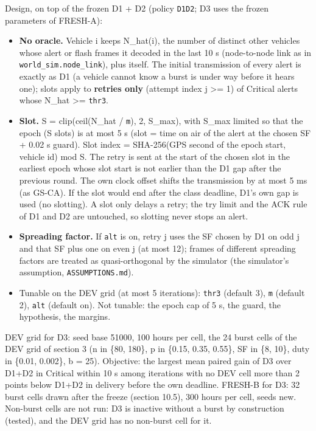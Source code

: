 Design, on top of the frozen D1 + D2 (policy \texttt{D1D2}; D3 uses the frozen parameters of FRESH-A):
\begin{itemize}
\item \textbf{No oracle.} Vehicle i keeps N\_hat(i), the number of distinct other vehicles whose alert or flash frames it decoded in the last 10 s (node-to-node link as in \texttt{world\_sim.node\_link}), plus itself. The initial transmission of every alert is exactly as D1 (a vehicle cannot know a burst is under way before it hears one); slots apply to \textbf{retries only} (attempt index j >= 1) of Critical alerts whose N\_hat >= \texttt{thr3}.
\item \textbf{Slot.} S = clip(ceil(N\_hat / \texttt{m}), 2, S\_max), with S\_max limited so that the epoch (S slots) is at most 5 s (slot = time on air of the alert at the chosen SF + 0.02 s guard). Slot index = SHA-256(GPS second of the epoch start, vehicle id) mod S. The retry is sent at the start of the chosen slot in the earliest epoch whose slot start is not earlier than the D1 gap after the previous round. The own clock offset shifts the transmission by at most 5 ms (as GS-CA). If the slot would end after the class deadline, D1's own gap is used (no slotting). A slot only delays a retry; the try limit and the ACK rule of D1 and D2 are untouched, so slotting never stops an alert.
\item \textbf{Spreading factor.} If \texttt{alt} is on, retry j uses the SF chosen by D1 on odd j and that SF plus one on even j (at most 12); frames of different spreading factors are treated as quasi-orthogonal by the simulator (the simulator's assumption, \texttt{ASSUMPTIONS.md}).
\item Tunable on the DEV grid (at most 5 iterations): \texttt{thr3} (default 3), \texttt{m} (default 2), \texttt{alt} (default on). Not tunable: the epoch cap of 5 s, the guard, the hypothesis, the margins.
\end{itemize}

DEV grid for D3: seed base 51000, 100 hours per cell, the 24 burst cells of the DEV grid of section 3 (n in \{80, 180\}, p in \{0.15, 0.35, 0.55\}, SF in \{8, 10\}, duty in \{0.01, 0.002\}, b = 25). Objective: the largest mean paired gain of D3 over D1+D2 in Critical within 10 s among iterations with no DEV cell more than 2 points below D1+D2 in delivery before the own deadline. FRESH-B for D3: 32 burst cells drawn after the freeze (section 10.5), 300 hours per cell, seeds new. Non-burst cells are not run: D3 is inactive without a burst by construction (tested), and the DEV grid has no non-burst cell for it.

